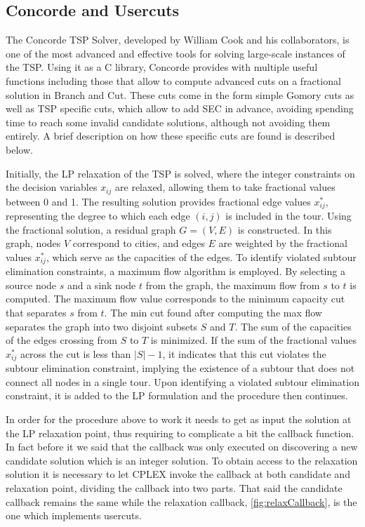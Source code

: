 \subsection{Concorde and  Usercuts}

The Concorde TSP Solver, developed by William Cook and his collaborators, is one of the most advanced and effective tools for solving large-scale instances of the TSP.
Using it as a C library, Concorde provides with multiple useful functions including those that allow to compute advanced cuts on a fractional solution in Branch and Cut.
These cuts come in the form simple Gomory cuts as well as TSP specific cuts, which allow to add SEC in advance, avoiding spending time to reach some invalid candidate solutions, although not avoiding them entirely.
A brief description on how these specific cuts are found is described below.

Initially, the LP relaxation of the TSP is solved, where the integer constraints on the decision variables \( x_{ij} \) are relaxed, allowing them to take fractional values between 0 and 1.
The resulting solution provides fractional edge values \( x_{ij}^* \), representing the degree to which each edge \( (i,j) \) is included in the tour.
Using the fractional solution, a residual graph \( G = (V, E) \) is constructed.
In this graph, nodes \( V \) correspond to cities, and edges \( E \) are weighted by the fractional values \( x_{ij}^* \), which serve as the capacities of the edges.
To identify violated subtour elimination constraints, a maximum flow algorithm is employed.
By selecting a source node \( s \) and a sink node \( t \) from the graph, the maximum flow from \( s \) to \( t \) is computed.
The maximum flow value corresponds to the minimum capacity cut that separates \( s \) from \( t \).
The min cut found after computing the max flow separates the graph into two disjoint subsets \( S \) and \( T \).
The sum of the capacities of the edges crossing from \( S \) to \( T \) is minimized.
If the sum of the fractional values \( x_{ij}^* \) across the cut is less than \( |S| - 1 \), it indicates that this cut violates the subtour elimination constraint, implying the existence of a subtour that does not connect all nodes in a single tour.
Upon identifying a violated subtour elimination constraint, it is added to the LP formulation and the procedure then continues.

In order for the procedure above to work it needs to get as input the solution at the LP relaxation point, thus requiring to complicate a bit the callback function.
In fact before it we said that the callback was only executed on discovering a new candidate solution which is an integer solution.
To obtain access to the relaxation solution it is necessary to let CPLEX invoke the callback at both candidate and relaxation point, dividing the callback into two parts.
That said the candidate callback remains the same while the relaxation callback, \figurename{ \ref{fig:relaxCallback}}, is the one which implements usercuts.


